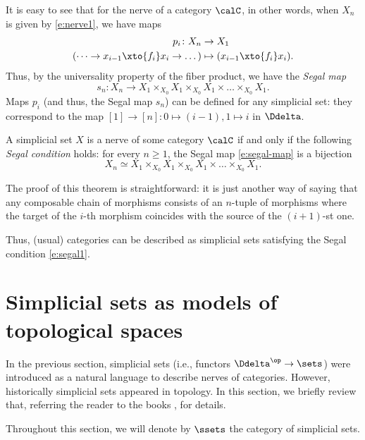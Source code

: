 It is easy to see that for the nerve of a category $\calC$, in other words,
when $X_n$ is given by \eqref{e:nerve1}, we have maps
\begin{align*}
p_i \colon X_n&\to X_1\\
(\dots \to x_{i-1} \xto{f_i} x_i\to \dots )&\mapsto ( x_{i-1} \xto{f_i} x_i).
\end{align*}
Thus, by the universality property of the fiber product, we have the \emph{Segal map}
\begin{equation}\label{e:segal-map}
   s_n\colon X_n \to
   X_1\times_{X_0} X_1\times_{X_0} X_1 \times\dots \times_{X_0} X_1.
\end{equation}
Maps $p_i$ (and thus, the Segal map $s_n$) can be defined for any simplicial set:
they correspond to the map $[1]\to[n]\colon 0\mapsto (i-1), 1\mapsto i$ in
$\Ddelta$.

\begin{theorem}\label{t:segal1}
  A simplicial set $X$ is a nerve of some category $\calC$ if and only if the
  following \emph{Segal condition} holds: for every $n\ge
  1$, the Segal map \eqref{e:segal-map} is a bijection
  \begin{equation}\label{e:segal1}
    X_n \simeq X_1\times_{X_0} X_1\times_{X_0} X_1 \times\dots \times_{X_0} X_1.
  \end{equation}
\end{theorem}
The proof of this theorem is straightforward:
it is just another way of saying that any
composable chain of morphisms consists of an $n$-tuple of morphisms where the
target of the $i$-th morphism coincides with the source of the $(i+1)$-st one.


Thus, (usual) categories can be described as simplicial sets satisfying the Segal
condition \eqref{e:segal1}.

\section{Simplicial sets as models of topological spaces}\label{s:sset}

In the previous section, simplicial sets (i.e., functors $\Ddelta^\op\to \sets$)
were introduced as a natural language to describe nerves of categories. However,
historically simplicial sets appeared in topology. In this section, we briefly
review that, referring the reader to the books ,
 for details.

Throughout this section, we will denote by $\ssets$ the category of simplicial
sets.

